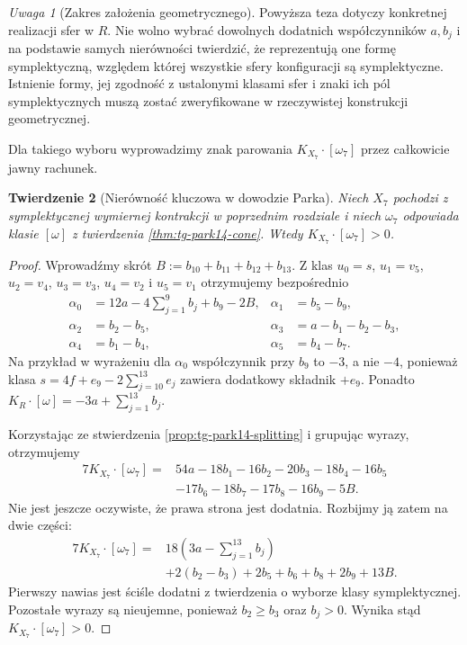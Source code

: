 \documentclass[11pt,a4paper]{report}
\numberwithin{equation}{section}
\theoremstyle{plain}
\newtheorem{twierdzenie}{Twierdzenie}[section]
\theoremstyle{definition}
\theoremstyle{remark}
\newtheorem{uwaga}[twierdzenie]{Uwaga}
\begin{document}
\begin{uwaga}[Zakres założenia geometrycznego]
Powyższa teza dotyczy konkretnej realizacji sfer w $R$.
Nie wolno wybrać dowolnych dodatnich współczynników
$a,b_j$ i na podstawie samych nierówności twierdzić,
że reprezentują one formę symplektyczną, względem której
wszystkie sfery konfiguracji są symplektyczne.
Istnienie formy, jej zgodność z ustalonymi klasami sfer
i znaki ich pól symplektycznych muszą zostać zweryfikowane
w rzeczywistej konstrukcji geometrycznej.
\end{uwaga}

Dla takiego wyboru wyprowadzimy znak parowania
$K_{X_7}\cdot[\omega_7]$ przez całkowicie jawny rachunek.

\begin{twierdzenie}[Nierówność kluczowa w dowodzie Parka]
\label{thm:tg-park14-positive}
Niech $X_7$ pochodzi z symplektycznej wymiernej kontrakcji
w poprzednim rozdziale i niech $\omega_7$ odpowiada klasie
$[\omega]$ z twierdzenia \ref{thm:tg-park14-cone}.
Wtedy $K_{X_7}\cdot[\omega_7]>0$.
\end{twierdzenie}

\begin{proof}
Wprowadźmy skrót $B:=b_{10}+b_{11}+b_{12}+b_{13}$.
Z klas $u_0=s$, $u_1=v_5$, $u_2=v_4$, $u_3=v_3$,
$u_4=v_2$ i $u_5=v_1$ otrzymujemy bezpośrednio
\[
\begin{aligned}
\alpha_0&=12a-4\sum_{j=1}^{9}b_j+b_9-2B,
 &\alpha_1&=b_5-b_9,\\
\alpha_2&=b_2-b_5,
 &\alpha_3&=a-b_1-b_2-b_3,\\
\alpha_4&=b_1-b_4,
 &\alpha_5&=b_4-b_7.
\end{aligned}
\]
Na przykład w wyrażeniu dla $\alpha_0$ współczynnik
przy $b_9$ to $-3$, a nie $-4$, ponieważ klasa
$s=4f+e_9-2\sum_{j=10}^{13}e_j$ zawiera dodatkowy
składnik $+e_9$. Ponadto
$K_R\cdot[\omega]=-3a+\sum_{j=1}^{13}b_j$.

Korzystając ze stwierdzenia \ref{prop:tg-park14-splitting}
i grupując wyrazy, otrzymujemy
\[
\begin{aligned}
7K_{X_7}\cdot[\omega_7]
={}&54a-18b_1-16b_2-20b_3-18b_4-16b_5\\
 &-17b_6-18b_7-17b_8-16b_9-5B.
\end{aligned}
\]
Nie jest jeszcze oczywiste, że prawa strona jest dodatnia.
Rozbijmy ją zatem na dwie części:
\[
\begin{aligned}
7K_{X_7}\cdot[\omega_7]
={}&18\left(3a-\sum_{j=1}^{13}b_j\right)\\
 &+2(b_2-b_3)+2b_5+b_6+b_8+2b_9+13B.
\end{aligned}
\]
Pierwszy nawias jest ściśle dodatni z twierdzenia
o wyborze klasy symplektycznej. Pozostałe wyrazy
są nieujemne, ponieważ $b_2\ge b_3$ oraz $b_j>0$.
Wynika stąd $K_{X_7}\cdot[\omega_7]>0$.
\end{proof}
\end{document}
